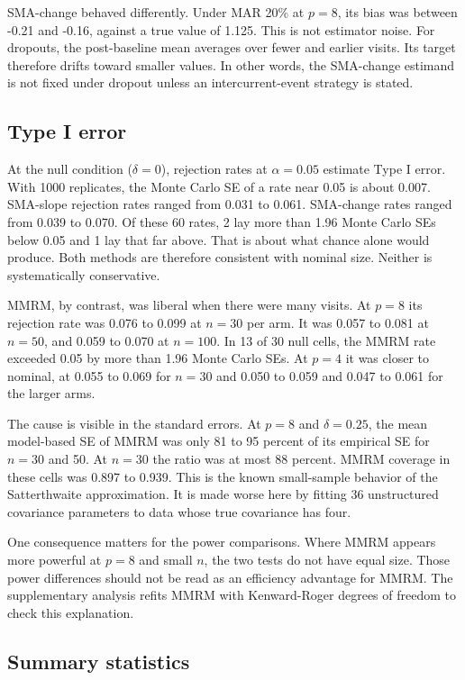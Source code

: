 \documentclass[
  11pt,
]{article}
\begin{document}
SMA-change behaved differently. Under MAR 20\% at \(p = 8\), its
bias was between -0.21 and
-0.16, against a true value of
1.125. This is not estimator
noise. For dropouts, the post-baseline mean averages over fewer
and earlier visits. Its target therefore drifts toward smaller
values. In other words, the SMA-change estimand is not fixed
under dropout unless an intercurrent-event strategy is stated.

\subsection{Type I error}\label{type-i-error}

At the null condition (\(\delta = 0\)), rejection rates at
\(\alpha = 0.05\) estimate Type I error. With 1000
replicates, the Monte Carlo SE of a rate near 0.05 is about
0.007. SMA-slope rejection rates
ranged from
0.031 to
0.061.
SMA-change rates ranged from
0.039 to
0.070.
Of these 60 rates,
2 lay more than 1.96 Monte Carlo SEs below
0.05 and 1 lay that far above. That is
about what chance alone would produce. Both methods are
therefore consistent with nominal size. Neither is systematically
conservative.

MMRM, by contrast, was liberal when there were many visits. At
\(p = 8\) its rejection rate was 0.076 to 0.099 at \(n = 30\) per
arm. It was 0.057 to 0.081 at \(n = 50\), and 0.059 to 0.070 at
\(n = 100\). In 13 of
30 null cells, the MMRM rate
exceeded 0.05 by more than 1.96 Monte Carlo SEs. At \(p = 4\) it
was closer to nominal, at 0.055 to 0.069 for \(n = 30\) and
0.050 to 0.059 and 0.047 to 0.061 for the larger arms.

The cause is visible in the standard errors. At \(p = 8\) and
\(\delta = 0.25\), the mean model-based SE of MMRM was only
81 to
95 percent of its
empirical SE for \(n = 30\) and 50. At \(n = 30\) the ratio was at
most 88
percent. MMRM coverage in these cells was
0.897 to
0.939. This is the known
small-sample behavior of the Satterthwaite approximation. It
is made worse here by fitting 36 unstructured covariance
parameters to data whose true covariance has four.

One consequence matters for the power comparisons. Where MMRM
appears more powerful at \(p = 8\) and small \(n\), the two tests
do not have equal size. Those power differences should not be
read as an efficiency advantage for MMRM. The supplementary
analysis refits MMRM with Kenward-Roger degrees of freedom to
check this explanation.

\subsection{Summary statistics}\label{summary-statistics}
\end{document}
